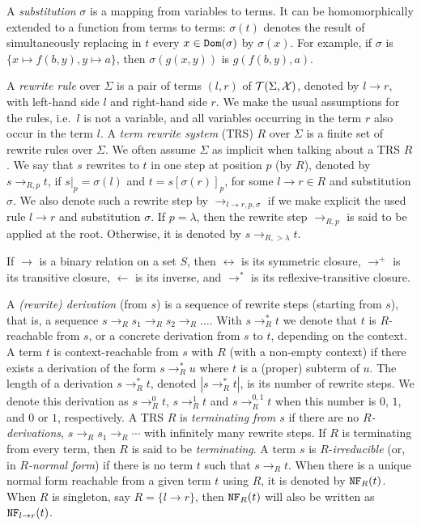 \documentclass{LMCS}
\theoremstyle{plain}
\def\Tau{{\mathcal T}}
\newcommand{\tor}{\to_R}
\begin{document}
A {\it substitution\/} $\sigma$ is a mapping from variables to terms.
It can be homomorphically extended to a function from
terms to terms:
$\sigma(t)$ denotes the result of
simultaneously replacing in $t$ every $x\in {\tt Dom}(\sigma)$ by $\sigma(x)$.
For example, if $\sigma$ is
$\{ x\mapsto f(b,y), y \mapsto a \}$, then
$\sigma(g(x,y))$ is $g(f(b,y),a)$.

A \emph{rewrite rule} over $\Sigma$
is a pair of terms $(l,r)$ of $\Tau(\Sigma,\X)$, denoted
by $l \to r$, with left-hand side $l$ and right-hand side $r$.
We make the usual assumptions for the rules, i.e.\ $l$ is not a variable,
and all variables occurring in the term $r$ also occur in the term $l$.
A \emph{term rewrite system} (TRS) $R$ over $\Sigma$ is a finite set of
rewrite rules over $\Sigma$. We often assume $\Sigma$ as implicit
when talking about a TRS $R$.
We say that $s$ rewrites to $t$ in one step at position $p$ (by $R$),
denoted by $s\to_{R,p} t$, if
$s|_p = \sigma(l)$ and $t = s[\sigma(r)]_p$, for some $l\to r\in R$
and substitution $\sigma$.
We also denote such a rewrite step by
$\rightarrow_{l\rightarrow r,p,\sigma}$
if we make explicit the used rule $l\rightarrow r$
and substitution $\sigma$.
If $p = \lambda$, then the rewrite step $\rightarrow_{R,p}$
is said to be applied at the root.
Otherwise, it is denoted by $s\rightarrow_{R,>\lambda} t$.

If $\to$ is a binary relation on a set $S$, then
$\leftrightarrow$ is its symmetric closure,
$\to^+$ is its transitive
closure, $\leftarrow$ is its inverse, and
$\to^*$ is its reflexive-transitive closure.

A \emph{(rewrite) derivation} (from $s$) is a sequence of
rewrite steps (starting from $s$), that is, a sequence
$s \tor s_1 \tor s_2 \tor \ldots$. With $s\rightarrow_R^* t$ we
denote that $t$ is $R$-reachable from $s$, or a concrete derivation
from $s$ to $t$, depending on the context.
A term $t$ is context-reachable from $s$ with $R$ (with a non-empty
context) if
there exists a derivation of the form $s\to_R^*u$ where
$t$ is a (proper) subterm of $u$.
The length of a derivation $s\to_R^*t$, denoted
$|s\to_R^*t|$, is its number of rewrite steps.
We denote this derivation as $s\to_R^0t$, $s\to_R^1t$
and $s\to_R^{0,1}t$ when this number is $0$, $1$, and
$0$ or $1$, respectively.
A TRS $R$ is {\em terminating from $s$}
if there are no {\em $R$-derivations},
$s \rightarrow_R s_1 \rightarrow_R \cdots$ with infinitely
many rewrite steps.
If $R$ is terminating from every term, then $R$ is 
said to be {\em terminating}.
A term $s$ is $R$-\emph{irreducible} (or, in {\em $R$-normal form}) 
if there is no term 
$t$ such that $s\rightarrow_R t$.
When there is a unique normal form reachable from a given term
$t$ using $R$, it is denoted by ${\tt NF}_R(t)$.
When $R$ is singleton, say $R = \{l\to r\}$, then
${\tt NF}_{R}(t)$ will also be written as ${\tt NF}_{l\to r}(t)$.
\end{document}
